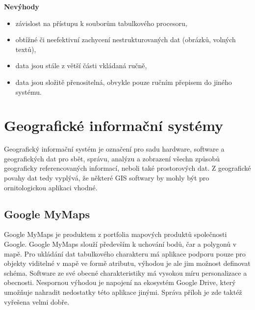 \textbf{Nevýhody}

\begin{itemize}
	\item závislost na přístupu k souborům tabulkového procesoru,
	\item obtížné či neefektivní zachycení nestrukturovaných dat (obrázků, volných textů),
	\item data jsou stále z větší části vkládaná ručně,
	\item data jsou složitě přenositelná, obvykle pouze ručním přepisem do jiného systému.
\end{itemize}

\section{Geografické informační systémy}


Geografický informační systém je označení pro sadu hardware, software a geografických dat pro sbět, správu, analýzu a zobrazení všechn způsobů geograficky referencovaných informací, neboli také prostorových dat. Z geografické povahy dat tedy vyplývá, že některé GIS softwary by mohly být pro ornitologickou aplikaci vhodné. 

\subsection{Google MyMaps}


Google MyMaps je produktem z portfolia mapových produktů společnosti Google. Google MyMaps slouží především k uchování bodů, čar a polygonů v mapě. Pro ukládání dat tabulkového charakteru má aplikace podporu pouze pro objekty viditelné v mapě ve formě atributu, výhodou je ale jim možnost definovat schéma. Software ze své obecné charakteristiky má vysokou míru personalizace a obecnosti. Nespornou výhodou je napojení na ekosystém Google Drive, který umožňuje nahradit nedostatky této aplikace jinými. Správa příloh je zde taktéž vyřešena velmi dobře.

